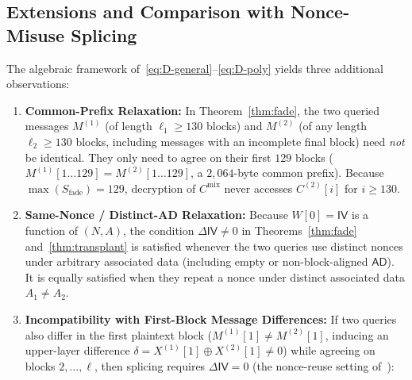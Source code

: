 \documentclass[11pt,a4paper]{article}
\theoremstyle{definition}
\theoremstyle{remark}
\newcommand{\IV}{\mathsf{IV}}
\newcommand{\AD}{\mathsf{AD}}
\begin{document}
\subsection{Extensions and Comparison with Nonce-Misuse Splicing}
\label{subsec:generalisations}
The algebraic framework of~\eqref{eq:D-general}--\eqref{eq:D-poly} yields three additional observations:
\begin{enumerate}[leftmargin=2em]
    \item \textbf{Common-Prefix Relaxation:} In Theorem~\ref{thm:fade}, the two queried messages $M^{(1)}$ (of length $\ell_1 \ge 130$ blocks) and $M^{(2)}$ (of any length $\ell_2 \ge 130$ blocks, including messages with an incomplete final block) need \emph{not} be identical. They only need to agree on their first $129$ blocks ($M^{(1)}[1 \dots 129] = M^{(2)}[1 \dots 129]$, a $2{,}064$-byte common prefix). Because $\max(S_{\mathrm{fade}}) = 129$, decryption of $C^{\mathrm{mix}}$ never accesses $C^{(2)}[i]$ for $i \ge 130$.
    \item \textbf{Same-Nonce / Distinct-AD Relaxation:} Because $W[0] = \IV$ is a function of $(N, A)$, the condition $\Delta\IV \neq 0$ in Theorems~\ref{thm:fade} and~\ref{thm:transplant} is satisfied whenever the two queries use distinct nonces under arbitrary associated data (including empty or non-block-aligned $\AD$). It is equally satisfied when they repeat a nonce under distinct associated data $A_1 \neq A_2$.
    \item \textbf{Incompatibility with First-Block Message Differences:} If two queries also differ in the first plaintext block ($M^{(1)}[1] \neq M^{(2)}[1]$, inducing an upper-layer difference $\delta = X^{(1)}[1] \oplus X^{(2)}[1] \neq 0$) while agreeing on blocks $2, \dots, \ell$, then splicing requires $\Delta\IV = 0$ (the nonce-reuse setting of~\cite{DN14,DLMN17}):
\end{enumerate}
\end{document}

